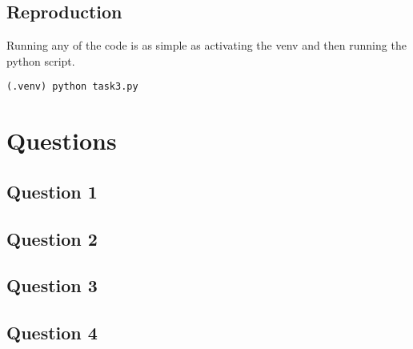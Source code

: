 \documentclass[11pt]{article}
\begin{document}
\subsection*{Reproduction}

Running any of the code is as simple as activating the venv and then running the python script.

\verb|(.venv) python task3.py|

\section*{Questions}
\subsection*{Question 1}

\subsection*{Question 2}

\subsection*{Question 3}

\subsection*{Question 4}
\end{document}
